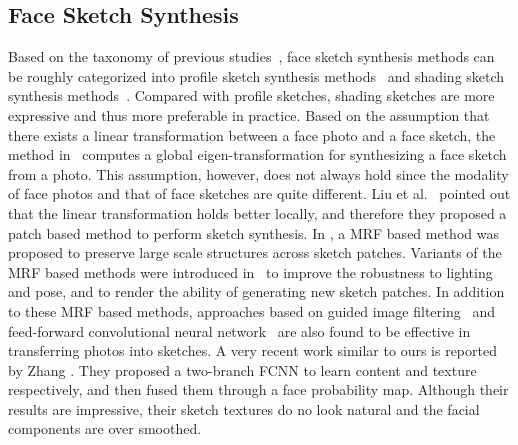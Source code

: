 \documentclass[10pt,twocolumn,letterpaper]{article}
\begin{document}
\subsection{Face Sketch Synthesis}
Based on the taxonomy of previous studies~\cite{song2014real,zhou2012markov}, face sketch synthesis methods can be roughly categorized into profile sketch synthesis methods~\cite{berger2013style,chen2001example,xu2008hierarchical} and shading sketch synthesis methods~\cite{liu2005nonlinear,song2014real,tang2003face,wang2009face,zhang2015end,zhang2010lighting,zhou2012markov}. Compared with profile sketches, shading sketches are more expressive and thus more preferable in practice. Based on the assumption that there exists a linear transformation between a face photo and a face sketch, the method in~\cite{tang2003face} computes a global eigen-transformation for synthesizing a face sketch from a photo. This assumption, however, does not always hold since the modality of face photos and that of face sketches are quite different. Liu et al.~\cite{liu2005nonlinear} pointed out that the linear transformation holds better locally, and therefore they proposed a patch based method to perform sketch synthesis. In \cite{wang2009face}, a MRF based method was proposed to preserve large scale structures across sketch patches. Variants of the MRF based methods were introduced in~\cite{zhang2010lighting,zhou2012markov} to improve the robustness to lighting and pose, and to render the ability of generating new sketch patches. In addition to these MRF based methods, approaches based on guided image filtering~\cite{song2014real} and feed-forward convolutional neural network~\cite{zhang2015end} are also found to be effective in transferring photos into sketches. A very recent work similar to ours is reported by Zhang \etal \cite{zhang2017content}. They proposed a two-branch FCNN to learn content and texture respectively, and then fused them through a face probability map. Although their results are impressive, their sketch textures do no look natural and the facial components are over smoothed.

\end{document}
